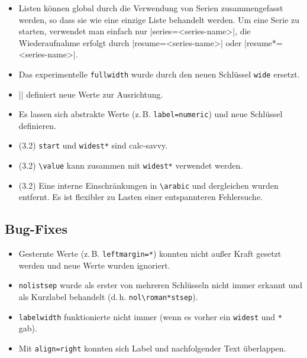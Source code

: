 \documentclass[a4paper,ngerman]{ltxguide}
\newcommand\0{\unskip\enspace\fbox{\fontsize{4}{4}\selectfont NEU 3.0}}
\newcommand\3{\unskip\enspace\fbox{\fontsize{4}{4}\selectfont NEW 3.0}}
\begin{document}
\begin{enumerate}[leftmargin=*]
\begin{enumerate}[leftmargin=\parindent]
\begin{enumerate}[labelindent=\parindent,|\allowbreak
| leftmargin=*,|\allowbreak| label=\Roman*.,|\allowbreak
| widest=IV,|\allowbreak| align=left]
\begin{enumerate}[label=\fbox{\arabic*}]
\begin{itemize}
\item Listen k\"onnen global durch die Verwendung von Serien zusammengefasst werden, so dass sie wie eine einzige 
Liste behandelt werden. Um eine Serie zu starten, verwendet man einfach nur |series=<series-name>|, die Wiederaufnahme 
erfolgt durch |resume=<series-name>| oder |resume*=<series-name>|.

\item Das \glqq experimentelle\grqq{} \verb|fullwidth| wurde durch den
neuen Schl\"ussel \verb|wide| ersetzt.

\item |\SetLabelAlign| definiert neue Werte zur Ausrichtung.

\item Es lassen sich \glqq abstrakte\grqq{} Werte (z.\,B. \verb|label=numeric|) und neue Schl\"ussel definieren.
\end{itemize}

\begin{itemize}
\item (3.2) \verb|start| und \verb|widest*| sind \textsf{calc}-savvy.

\item (3.2) \verb|\value| kann zusammen mit \verb|widest*| verwendet werden.

\item (3.2) Eine interne Einschr\"ankungen in \verb|\arabic| und dergleichen wurden entfernt. Es ist flexibler zu Lasten 
einer \glqq entspannteren\grqq{} Fehlersuche.

\end{itemize}
	
	\subsection{Bug-Fixes}
	
\begin{itemize}
\item Gesternte Werte (z.\,B. \verb|leftmargin=*|) konnten nicht au\ss er Kraft gesetzt werden und neue Werte wurden
ignoriert.

\item \verb|nolistsep| wurde als erster von mehreren Schl\"usseln nicht immer erkannt und als Kurzlabel behandelt 
(d.\,h. \verb|nol\roman*stsep|).

\item \verb|labelwidth| funktionierte nicht immer (wenn es vorher ein
\verb|widest| und \verb|*| gab).

\item Mit \verb|align=right| konnten sich Label und nachfolgender Text \"uberlappen.


\end{itemize}
\end{enumerate}
\end{enumerate}
\end{enumerate}
\end{enumerate}
\end{document}
